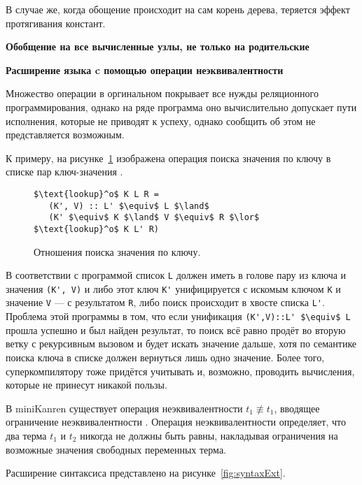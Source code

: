 В случае же, когда обощение происходит на сам корень дерева, теряется эффект протягивания
констант.

\textbf{Обобщение на все вычисленные узлы, не только на родительские}

\textbf{Расширение языка \ukanren c помощью операции неэквивалентности}

Множество операции в оргинальном \ukanren покрывает все нужды реляционного программирования,
однако на ряде программа оно вычислительно допускает пути исполнения, которые не приводят
к успеху, однако сообщить об этом не представляется возможным.

К примеру, на рисунке~\ref{fig:lookup} изображена операция поиска значения по ключу
в списке пар ключ-значения .

\begin{figure}[h!]
\begin{lstlisting}
$\text{lookup}^o$ K L R =
   (K', V) :: L' $\equiv$ L $\land$
   (K' $\equiv$ K $\land$ V $\equiv$ R $\lor$ $\text{lookup}^o$ K L' R)
\end{lstlisting}
\caption{Отношения поиска значения по ключу.}
\label{fig:lookup}
\end{figure}

В соответствии с программой список \lstinline{L} должен иметь в голове пару из ключа и значения \lstinline{(K', V)}
и либо  этот ключ \lstinline{K'} унифицируется с искомым ключом \lstinline{K} и
значение \lstinline{V} --- с результатом \lstinline{R},
либо поиск происходит в хвосте списка \lstinline{L'}. Проблема этой программы в том,
что если унификация \lstinline{(K',V)::L' $\equiv$ L} прошла успешно и был
найден результат, то поиск всё равно продёт во вторую ветку с рекурсивным вызовом и будет
искать значение дальше, хотя по семантике поиска ключа в списке должен вернуться лишь одно значение.
Более того, суперкомпилятору тоже придётся учитывать и, возможно, проводить вычисления,
которые не принесут никакой пользы.

В miniKanren существует операция неэквивалентности $t_1 \not\equiv t_1$, вводящее
ограничение неэквивалентности \cite{mkConstr}.
Операция неэквивалентности определяет, что два терма $t_1$ и $t_2$ никогда не должны быть равны,
накладывая ограничения на возможные значения свободных переменных терма.

Расширение синтаксиса \ukanren представлено на рисунке~\ref{fig:syntaxExt}.

